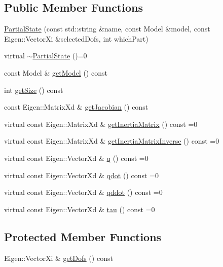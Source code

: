 \subsection*{Public Member Functions}
\begin{DoxyCompactItemize}
\item 
\hyperlink{classocra_1_1PartialState_ab6f225c821033965da2ccd5924c23915}{Partial\+State} (const std\+::string \&name, const Model \&model, const Eigen\+::\+Vector\+Xi \&selected\+Dofs, int which\+Part)
\item 
virtual \hyperlink{classocra_1_1PartialState_a6426dc8cd115e310f16f0d244802618f}{$\sim$\+Partial\+State} ()=0
\item 
const Model \& \hyperlink{classocra_1_1PartialState_a2de65bbf0d2bb85a98d444c3f3bf0b06}{get\+Model} () const
\item 
int \hyperlink{classocra_1_1PartialState_a220a155999e190427083af329d1f52b0}{get\+Size} () const
\item 
const Eigen\+::\+Matrix\+Xd \& \hyperlink{classocra_1_1PartialState_a563b7fb82df68c847120211884019e17}{get\+Jacobian} () const
\item 
virtual const Eigen\+::\+Matrix\+Xd \& \hyperlink{classocra_1_1PartialState_ad811a25932f0fad439242ebd48841162}{get\+Inertia\+Matrix} () const =0
\item 
virtual const Eigen\+::\+Matrix\+Xd \& \hyperlink{classocra_1_1PartialState_a83979e39dd3631861c724514e49cb8b4}{get\+Inertia\+Matrix\+Inverse} () const =0
\item 
virtual const Eigen\+::\+Vector\+Xd \& \hyperlink{classocra_1_1PartialState_a28f537d2c569eddb7f7d6dbbea073226}{q} () const =0
\item 
virtual const Eigen\+::\+Vector\+Xd \& \hyperlink{classocra_1_1PartialState_a5af623db2ae7e68cb4658f226e8ae006}{qdot} () const =0
\item 
virtual const Eigen\+::\+Vector\+Xd \& \hyperlink{classocra_1_1PartialState_ad12359c11926c2151dc1459e88b9fedc}{qddot} () const =0
\item 
virtual const Eigen\+::\+Vector\+Xd \& \hyperlink{classocra_1_1PartialState_a875575d215c7fe9278d47ff6f392bb84}{tau} () const =0
\end{DoxyCompactItemize}
\subsection*{Protected Member Functions}
\begin{DoxyCompactItemize}
\item 
Eigen\+::\+Vector\+Xi \& \hyperlink{classocra_1_1PartialState_a969bb0d941f73df7da78aba4339908c4}{get\+Dofs} () const
\end{DoxyCompactItemize}


